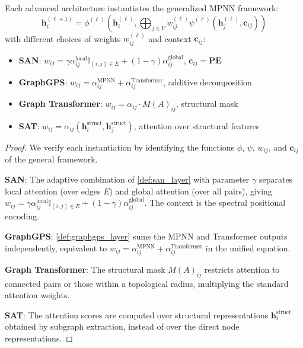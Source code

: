 \begin{proposition}\label{prop:unified_advanced_architectures}
Each advanced architecture instantiates the generalized MPNN framework:
\begin{equation}
    \mathbf{h}_i^{(\ell+1)} = \phi^{(\ell)}\left(\mathbf{h}_i^{(\ell)}, \bigoplus_{j \in V} w_{ij}^{(\ell)} \psi^{(\ell)}(\mathbf{h}_j^{(\ell)}, \mathbf{c}_{ij})\right)
    \label{eq:unified_mpnn_generalized}
\end{equation}
with different choices of weights $w_{ij}^{(\ell)}$ and context $\mathbf{c}_{ij}$:
\begin{itemize}
    \item \textbf{SAN}: $w_{ij} = \gamma \alpha_{ij}^{\text{local}} \mathbb{I}_{(i,j) \in E} + (1-\gamma) \alpha_{ij}^{\text{global}}$, $\mathbf{c}_{ij} = \mathbf{PE}$
    \item \textbf{GraphGPS}: $w_{ij} = \alpha_{ij}^{\text{MPNN}} + \alpha_{ij}^{\text{Transformer}}$, additive decomposition
    \item \textbf{Graph Transformer}: $w_{ij} = \alpha_{ij} \cdot M(A)_{ij}$, structural mask
    \item \textbf{SAT}: $w_{ij} = \alpha_{ij}(\mathbf{h}_i^{\text{struct}}, \mathbf{h}_j^{\text{struct}})$, attention over structural features
\end{itemize}
\end{proposition}

\begin{proof}
We verify each instantiation by identifying the functions $\phi$, $\psi$, $w_{ij}$, and $\mathbf{c}_{ij}$ of the general framework.

\textbf{SAN}: The adaptive combination of \autoref{def:san_layer} with parameter $\gamma$ separates local attention (over edges $E$) and global attention (over all pairs), giving $w_{ij} = \gamma \alpha_{ij}^{\text{local}} \mathbb{I}_{(i,j) \in E} + (1-\gamma) \alpha_{ij}^{\text{global}}$. The context is the spectral positional encoding.

\textbf{GraphGPS}: \autoref{def:graphgps_layer} sums the MPNN and Transformer outputs independently, equivalent to $w_{ij} = \alpha_{ij}^{\text{MPNN}} + \alpha_{ij}^{\text{Transformer}}$ in the unified equation.

\textbf{Graph Transformer}: The structural mask $M(A)_{ij}$ restricts attention to connected pairs or those within a topological radius, multiplying the standard attention weights.

\textbf{SAT}: The attention scores are computed over structural representations $\mathbf{h}_i^{\text{struct}}$ obtained by subgraph extraction, instead of over the direct node representations.
\end{proof}

